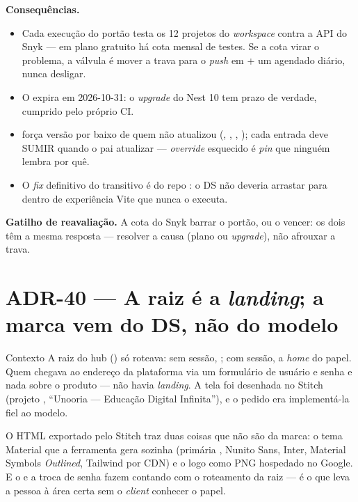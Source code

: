 \textbf{Consequências.}
\begin{itemize}
  \item Cada execução do portão testa os 12 projetos do \emph{workspace} contra
    a API do Snyk --- em plano gratuito há cota mensal de testes. Se a cota
    virar o problema, a válvula é mover a trava para o \emph{push} em
     + um agendado diário, nunca desligar.
  \item O  expira em 2026-10-31: o \emph{upgrade} do Nest 10
    tem prazo de verdade, cumprido pelo próprio CI.
  \item {} força versão por baixo de quem não atualizou
    (, , , );
    cada entrada deve SUMIR quando o pai atualizar --- \emph{override} esquecido
    é \emph{pin} que ninguém lembra por quê.
  \item O \emph{fix} definitivo do  transitivo é do repo
    : o DS não deveria arrastar  para dentro de
    experiência Vite que nunca o executa.
\end{itemize}

\textbf{Gatilho de reavaliação.} A cota do Snyk barrar o portão, ou o
 vencer: os dois têm a mesma resposta --- resolver a causa (plano ou
\emph{upgrade}), não afrouxar a trava.

\section{ADR-40 --- A raiz é a \emph{landing}; a marca vem do DS, não do modelo}
\label{adr:landing}

\begin{especificacao}{Contexto}
A raiz do hub (\rota{/}) só roteava: sem sessão, ; com sessão, a
\emph{home} do papel. Quem chegava ao endereço da plataforma via um formulário
de usuário e senha e nada sobre o produto --- não havia \emph{landing}. A tela
foi desenhada no Stitch (projeto , ``Unooria ---
Educação Digital Infinita''), e o pedido era implementá-la fiel ao modelo.

O HTML exportado pelo Stitch traz duas coisas que não são da marca: o tema
Material que a ferramenta gera sozinha (primária , Nunito Sans,
Inter, Material Symbols \emph{Outlined}, Tailwind por CDN) e o logo como PNG
hospedado no Google. E o  e a troca de senha fazem
 contando com o roteamento da raiz --- é o que leva a
pessoa à área certa sem o \emph{client} conhecer o papel.
\end{especificacao}


